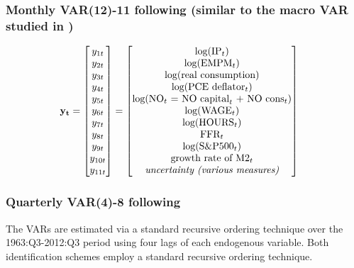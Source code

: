 \documentclass[a4paper,11pt,listof=nochaptergap,oneside,pointednumbers,bibtotoc,bigheadings,liststotoc,hidelinks]{scrbook}
\theoremstyle{mysatz}
\theoremstyle{mydefinition}
\theoremstyle{mytheorem}
\theoremstyle{mybemerkung}
\newcommand{\vect}[1]{\boldsymbol{\mathbf{#1}}}
\begin{document}
\subsubsection{Monthly VAR(12)-11 following \citet{juradoetal:15} (similar to the macro VAR studied in \citealp{christianoetal:05})}
\begin{equation} \label{eq:VAR19}
\begin{split}
\vect{y_t} & = 
 \begin{bmatrix} 
 		y_{1t} \\
		y_{2t} \\
		y_{3t} \\
		y_{4t} \\
		y_{5t} \\
		y_{6t} \\
		y_{7t} \\
		y_{8t} \\
		y_{9t} \\
		y_{10t} \\
		y_{11t}
	      \end{bmatrix} = 	      
	      \begin{bmatrix} \text{log($\text{IP}_t$)} \\ 
				      \text{log($\text{EMPM}_t$)}\\ 
				      \text{log(real consumption)}\\
				      \text{log($\text{PCE deflator}_t$)}\\
				      \text{log($\text{NO}_t$ $=$ $\text{NO capital}_t$ $+$ $\text{NO cons}_t$)}\\
				      \text{log($\text{WAGE}_t$)}\\
				      \text{log($\text{HOURS}_t$)}\\
				      \text{$\text{FFR}_t$} \\
				      \text{log($\text{S\&P500}_t$)} \\
				      \text{growth rate of $\text{M2}_t$} \\
				      \text{\textit{uncertainty (various measures)}}
	      \end{bmatrix}
\end{split}
\end{equation}

\subsubsection{Quarterly VAR(4)-8 following \citet{gilchristetal:14}}
The VARs are estimated via a standard recursive ordering technique over the 1963:Q3-2012:Q3 period using four lags of each endogenous variable. Both identification schemes employ a standard recursive ordering technique.\\
\end{document}
